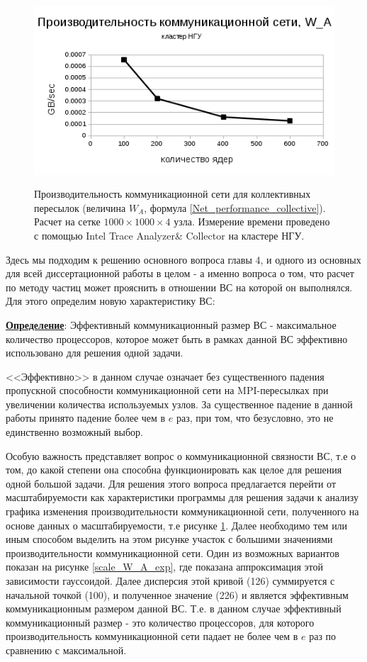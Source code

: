 \begin{figure}[h]
	
	
	\begin{center}
		\includegraphics[height=7cm,keepaspectratio]{images/scaleNSU_W_A_new.png}
		\caption{
		 Производительность коммуникационной сети для коллективных пересылок (величина $W_A$, формула \ref{Net_performance_collective}). Расчет на сетке $1000 \times 1000 \times 4$ узла. Измерение времени проведено с помощью Intel Trace Analyzer\& Collector на кластере НГУ.
		}
		\label{scale_W_A}
	\end{center} 
\end{figure}
     Здесь мы подходим к решению основного вопроса главы 4, и одного из основных для всей диссертационной работы в целом - а именно вопроса о том, что расчет по методу частиц может прояснить в отношении ВС на которой он выполнялся. Для этого определим новую характеристику ВС:
     
     \underline{\textbf{Определение}}: Эффективный коммуникационный размер ВС - максимальное количество процессоров, которое может быть в рамках данной ВС эффективно использовано для решения одной задачи.  
     
     <<Эффективно>> в данном случае означает без существенного падения пропускной способности коммуникационной сети на MPI-пересылках при увеличении количества используемых узлов. За существенное падение в данной работы принято падение более чем в $e$ раз, при том, что безусловно, это не единственно возможный выбор. 
     
     Особую важность представляет вопрос о коммуникационной связности ВС, т.е о том, до какой степени она способна функционировать как целое для решения одной большой задачи. Для решения этого вопроса предлагается перейти от масштабируемости как характеристики программы для решения задачи к анализу графика изменения производительности коммуникационной сети, полученного на основе данных о масштабируемости, т.е рисунке \ref{scale_W_A}. Далее необходимо тем или иным способом выделить на этом рисунке участок с большими значениями производительности коммуникационной сети.
     Один из возможных вариантов показан на рисунке \ref{scale_W_A_exp}, где показана аппроксимация этой зависимости гауссоидой. Далее дисперсия этой кривой (126) суммируется с начальной точкой (100), и полученное значение (226) и является эффективным коммуникационным размером данной ВС. Т.е. в данном случае эффективный коммуникационный размер - это количество процессоров, для которого производительность коммуникационной сети падает не более чем в $e$ раз по сравнению с максимальной.
     
